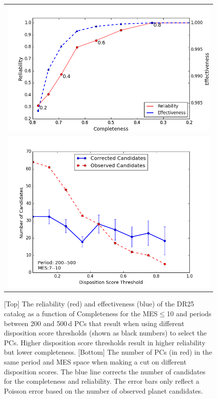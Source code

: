 \begin{figure}[ht]
 \begin{center}
 \begin{tabular}{c}
  \includegraphics[width=1.0\linewidth]{fig-CRadjustScore-DR25.png} \\
  \includegraphics[width=1.0\linewidth]{fig-varyScoreNcandidatesBox2.png}
  \end{tabular}
  \caption{\label{f:adjscore}[Top] The reliability (red) and effectiveness (blue) of the DR25 catalog as a function of Completeness for the MES$\leq$10 and periods between 200 and 500\,d PCs that result when using different disposition score thresholds (shown as black numbers) to select the PCs. Higher disposition score thresholds result in higher reliability but lower completeness. [Bottom] The number of PCs (in red) in the same period and MES space when making a cut on different disposition scores.  The blue line corrects the number of candidates for the completeness and reliability. The error bars only reflect a Poisson error based on the number of observed planet candidates.}
 \end{center}
 \end{figure}


